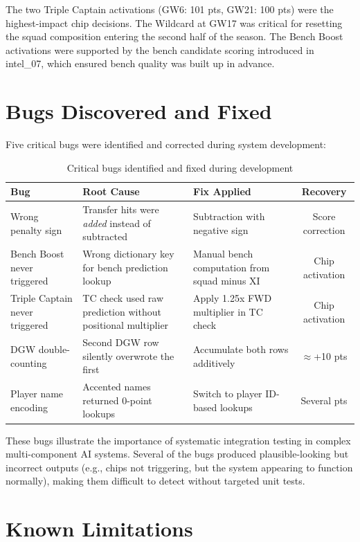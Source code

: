 The two Triple Captain activations (GW6: 101 pts, GW21: 100 pts) were the highest-impact chip decisions. The Wildcard at GW17 was critical for resetting the squad composition entering the second half of the season. The Bench Boost activations were supported by the bench candidate scoring introduced in intel\_07, which ensured bench quality was built up in advance.

\section{Bugs Discovered and Fixed}

Five critical bugs were identified and corrected during system development:

\begin{table}[h]
\centering
\caption{Critical bugs identified and fixed during development}
\label{tab:bugs_en}
\begin{tabular}{p{3cm}p{3.5cm}p{3.5cm}c}
\toprule
\textbf{Bug} & \textbf{Root Cause} & \textbf{Fix Applied} & \textbf{Recovery} \\
\midrule
Wrong penalty sign & Transfer hits were \textit{added} instead of subtracted & Subtraction with negative sign & Score correction \\
Bench Boost never triggered & Wrong dictionary key for bench prediction lookup & Manual bench computation from squad minus XI & Chip activation \\
Triple Captain never triggered & TC check used raw prediction without positional multiplier & Apply 1.25x FWD multiplier in TC check & Chip activation \\
DGW double-counting & Second DGW row silently overwrote the first & Accumulate both rows additively & $\approx$+10 pts \\
Player name encoding & Accented names returned 0-point lookups & Switch to player ID-based lookups & Several pts \\
\bottomrule
\end{tabular}
\end{table}

These bugs illustrate the importance of systematic integration testing in complex multi-component AI systems. Several of the bugs produced plausible-looking but incorrect outputs (e.g., chips not triggering, but the system appearing to function normally), making them difficult to detect without targeted unit tests.

\section{Known Limitations}

